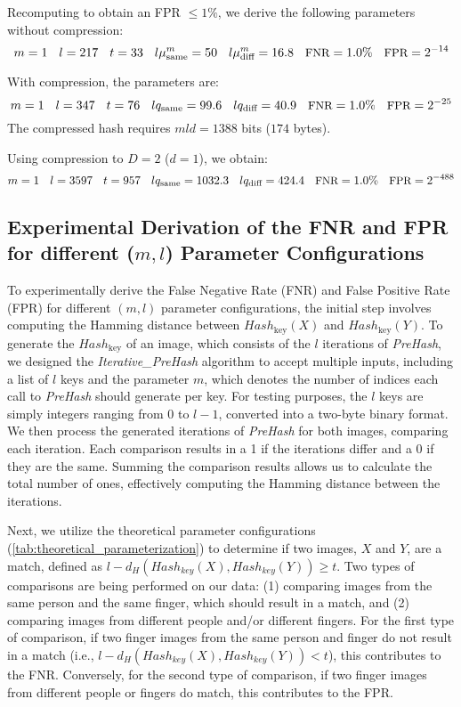 Recomputing to obtain an FPR \(\leq 1\%\), we derive the following parameters without compression:
\begin{equation}
\small
m = 1 \quad l = 217 \quad t = 33 \quad l\mu_{\text{same}}^m = 50 \quad l\mu_{\text{diff}}^m = 16.8 \quad \text{FNR} = 1.0\% \quad \text{FPR} = 2^{-14}
\end{equation}

With compression, the parameters are:
\begin{equation}
\small
m = 1 \quad l = 347 \quad t = 76 \quad lq_{\text{same}} = 99.6 \quad lq_{\text{diff}} = 40.9 \quad \text{FNR} = 1.0\% \quad \text{FPR} = 2^{-25}
\end{equation}
The compressed hash requires \( mld = 1388 \) bits (\( 174 \) bytes).

Using compression to \( D = 2 \) (\( d = 1 \)), we obtain:
\begin{equation}
\small
m = 1 \quad l = 3597 \quad t = 957 \quad lq_{\text{same}} = 1032.3 \quad lq_{\text{diff}} = 424.4 \quad \text{FNR} = 1.0\% \quad \text{FPR} = 2^{-488}
\end{equation}


\subsection{Experimental Derivation of the FNR and FPR for different (\(m, l\)) Parameter Configurations}
To experimentally derive the False Negative Rate (FNR) and False Positive Rate (FPR) for different \((m, l)\) parameter configurations, the initial step involves computing the Hamming distance between \( Hash_{\text{key}}(X) \) and \( Hash_{\text{key}}(Y) \). To generate the \( Hash_{\text{key}} \) of an image, which consists of the \( l \) iterations of \textit{PreHash}, we designed the \textit{Iterative\_PreHash} algorithm to accept multiple inputs, including a list of \( l \) keys and the parameter \( m \), which denotes the number of indices each call to \textit{PreHash} should generate per key. For testing purposes, the \( l \) keys are simply integers ranging from 0 to \( l-1 \), converted into a two-byte binary format. We then process the generated iterations of \textit{PreHash} for both images, comparing each iteration. Each comparison results in a 1 if the iterations differ and a 0 if they are the same. Summing the comparison results allows us to calculate the total number of ones, effectively computing the Hamming distance between the iterations.

Next, we utilize the theoretical parameter configurations (\ref{tab:theoretical_parameterization}) to determine if two images, \(X\) and \(Y\), are a match, defined as \(l - d_H(Hash_{key}(X), Hash_{key}(Y)) \geq t \). Two types of comparisons are being performed on our data: (1) comparing images from the same person and the same finger, which should result in a match, and (2) comparing images from different people and/or different fingers. For the first type of comparison, if two finger images from the same person and finger do not result in a match (i.e., \( l - d_H(Hash_{key}(X), Hash_{key}(Y)) < t \)), this contributes to the FNR. Conversely, for the second type of comparison, if two finger images from different people or fingers do match, this contributes to the FPR.

